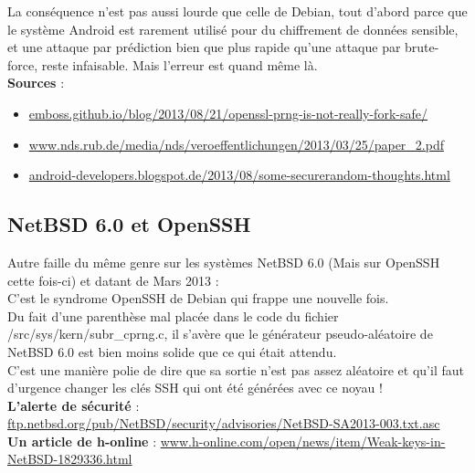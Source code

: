 \documentclass{article}
\begin{document}
	La conséquence n'est pas aussi lourde que celle de Debian, tout d'abord 
	parce que le système Android est rarement utilisé pour du 
	chiffrement de données sensible, et une attaque par prédiction bien que
	plus rapide qu'une attaque par brute-force, reste infaisable. 
	Mais l'erreur est quand même là. \\

	\textbf{Sources} : 
	\begin{itemize}
		\item \href{http://emboss.github.io/blog/2013/08/21/openssl-prng-is-not-really-fork-safe/}
		{emboss.github.io/blog/2013/08/21/openssl-prng-is-not-really-fork-safe/}
		\item \href{http://www.nds.rub.de/media/nds/veroeffentlichungen/2013/03/25/paper\_2.pdf}
		{www.nds.rub.de/media/nds/veroeffentlichungen/2013/03/25/paper\_2.pdf}
		\item \href{http://android-developers.blogspot.de/2013/08/some-securerandom-thoughts.html}
		{android-developers.blogspot.de/2013/08/some-securerandom-thoughts.html}\\
	\end{itemize}

	\subsection{NetBSD 6.0 et OpenSSH}

	Autre faille du même genre sur les systèmes NetBSD 6.0 (Mais sur OpenSSH 
	cette fois-ci) et datant de Mars 2013 : \\

	C'est le syndrome OpenSSH de Debian qui frappe une nouvelle fois.\\
	Du fait d'une parenthèse mal placée dans le code du fichier 
	/src/sys/kern/subr\_cprng.c, il s'avère que le générateur pseudo-aléatoire 
	de NetBSD 6.0 est bien moins solide que ce qui était attendu.\\
	C'est une manière polie de dire que sa sortie n'est pas assez aléatoire et 
	qu'il faut d'urgence changer les clés SSH qui ont été générées avec ce noyau !\\

	\textbf{L'alerte de sécurité} : \href{http://ftp.netbsd.org/pub/NetBSD/security/advisories/NetBSD-SA2013-003.txt.asc}
	{ftp.netbsd.org/pub/NetBSD/security/advisories/NetBSD-SA2013-003.txt.asc}\\
	
	\textbf{Un article de h-online} : \href{http://www.h-online.com/open/news/item/Weak-keys-in-NetBSD-1829336.html}
	{www.h-online.com/open/news/item/Weak-keys-in-NetBSD-1829336.html}\\
\end{document}
